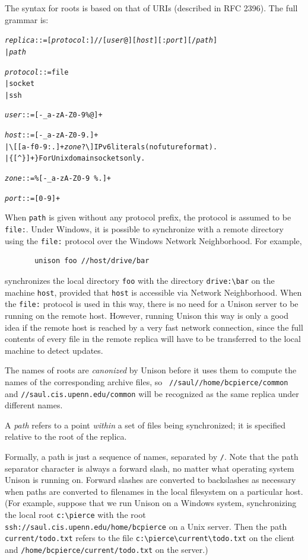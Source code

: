 \documentclass{article}
\newcommand{\NT}[1]{\textit{#1}}
\begin{document}
The syntax for roots is based on that of URIs (described in RFC 2396).
The full grammar is:
\begin{alltt}
  \NT{replica} ::= [\NT{protocol}:]//[\NT{user}@][\NT{host}][:\NT{port}][/\NT{path}]
           |  \NT{path}

  \NT{protocol} ::= file
            |  socket
            |  ssh

  \NT{user} ::= [-\_a-zA-Z0-9\%@]+

  \NT{host} ::= [-\_a-zA-Z0-9.]+
        |  \textrm{\textbackslash}[ [a-f0-9:.]+ \NT{zone}? \textrm{\textbackslash}]    IPv6 literals (no future format).
        |  \textrm{\{} [\^{}\textrm{\}}]+ \textrm{\}}                   For Unix domain sockets only.

  \NT{zone} ::= \%[-\_a-zA-Z0-9~\%.]+

  \NT{port} ::= [0-9]+
\end{alltt}
When \verb|path| is given without any protocol prefix, the protocol is
assumed to be \verb|file:|.  Under Windows, it is possible to
synchronize with a remote directory using the \verb|file:| protocol over
the Windows Network Neighborhood.  For example,
\begin{verbatim}
       unison foo //host/drive/bar
\end{verbatim}
\noindent
synchronizes the local directory \verb|foo| with the directory
\verb|drive:\bar| on the machine \verb|host|, provided that \verb|host|
is accessible via Network Neighborhood.  When the \verb|file:| protocol
is used in this way, there is no need for a Unison server to be running
on the remote host.  However, running Unison this way is only a good
idea if the remote host is reached by a very fast network connection,
since the full contents of every file in the remote replica will have to
be transferred to the local machine to detect updates.

The names of roots are {\em canonized} by Unison before it uses them
to compute the names of the corresponding archive files, so {\tt
  //saul//home/bcpierce/common} and {\tt //saul.cis.upenn.edu/common}
will be recognized as the same replica under different names.


A {\em path} refers to a point {\em within} a set of files being
synchronized; it is specified relative to the root of the replica.

Formally, a path is just a sequence of names, separated by \verb|/|.
Note that the path separator character is always a forward slash, no
matter what operating system Unison is running on.  Forward slashes
are converted to backslashes as necessary when paths are converted to
filenames in the local filesystem on a particular host.
%
(For example, suppose that we run Unison on a Windows system, synchronizing
the local root \verb|c:\pierce| with the root
\verb|ssh://saul.cis.upenn.edu/home/bcpierce| on a Unix server.  Then
the path \verb|current/todo.txt| refers to the file
\verb|c:\pierce\current\todo.txt| on the client and
\verb|/home/bcpierce/current/todo.txt| on the server.)
\end{document}
